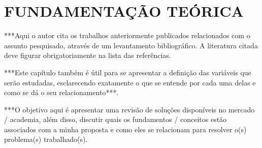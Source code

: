 \section{FUNDAMENTAÇÃO TEÓRICA}

***Aqui o autor cita os trabalhos anteriormente publicados relacionados com o assunto pesquisado, através de um levantamento bibliográfico. A literatura citada deve figurar obrigatoriamente na lista das referências.

***Este capítulo também é útil para se apresentar a definição das variáveis que serão estudadas, esclarecendo exatamente o que se entende por cada uma delas e como se dá o seu relacionamento***.

***O objetivo aqui é apresentar uma revisão de soluções disponíveis no mercado / academia, além disso, discutir quais os fundamentos / conceitos estão associados com a minha proposta e como eles se relacionam para resolver o(s) problema(s) trabalhado(s).